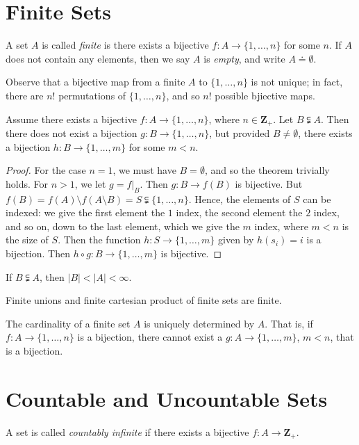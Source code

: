 \section{Finite Sets}
\begin{definition}
	A set $A$ is called \emph{finite} is there exists a bijective
	$f: A \to \{ 1, \dots, n\}$ for some $n$. If $A$ does not contain any
	elements, then we say $A$ is \emph{empty}, and write $A \doteq \emptyset$.
\end{definition}
Observe that a bijective map from a finite $A$ to $\{1, \dots, n\}$ is not
unique; in fact, there are $n$! permutations of $\{1, \dots, n\}$, and so $n$! possible
bjiective maps.
\begin{theorem}\label{thm:subset-bij}
	Assume there exists a bijective $f: A \to \{1, \dots, n\}$, where $n \in
	\mathbf{Z}_{+}$. Let $B \subsetneqq A$. Then there does not exist a bijection $g: B
	\to \{1, \dots, n\}$, but provided $B \neq \emptyset$, there exists a
	bijection $h: B \to \{1, \dots, m\}$ for some $m < n$.
\end{theorem}
\begin{proof}
	For the case $n=1$, we must have $B = \emptyset$, and so the theorem
	trivially holds. For $n>1$, we let $g = f |_{B}$. Then $g: B \to f(B)$ is bijective. But
	$f(B) = f(A) \setminus f(A \setminus B) = S \subsetneqq \{1, \dots, n\}$.
	Hence, the elements of $S$ can be indexed: we give the first element the
	$1$ index, the second element the $2$ index, and so on, down to the last
	element, which we give the $m$ index, where $m < n$ is the size of $S$.
	Then the function $h: S \to \{1, \dots, m\}$ given by $h(s_{i}) = i$
	is a bijection. Then $h \circ g: B \to \{1, \dots, m\}$ is bijective.
\end{proof}
\begin{corollary}
	If $B \subsetneqq A$, then $|B| < |A| < \infty$.
\end{corollary}
\begin{corollary}
	Finite unions and finite cartesian product of finite sets are finite.
\end{corollary}
\begin{corollary}
	The cardinality of a finite set $A$ is uniquely determined by $A$. That is,
	if $f: A \to \{1, \dots, n\}$ is a bijection, there cannot exist a
	$g: A \to \{ 1, \dots, m\}$, $m < n$, that is a bijection.
\end{corollary}
\section{Countable and Uncountable Sets}
\begin{definition}
	A set is called \emph{countably infinite} if there exists a bijective
	$f: A \to \mathbf{Z}_{+}$.
\end{definition}

